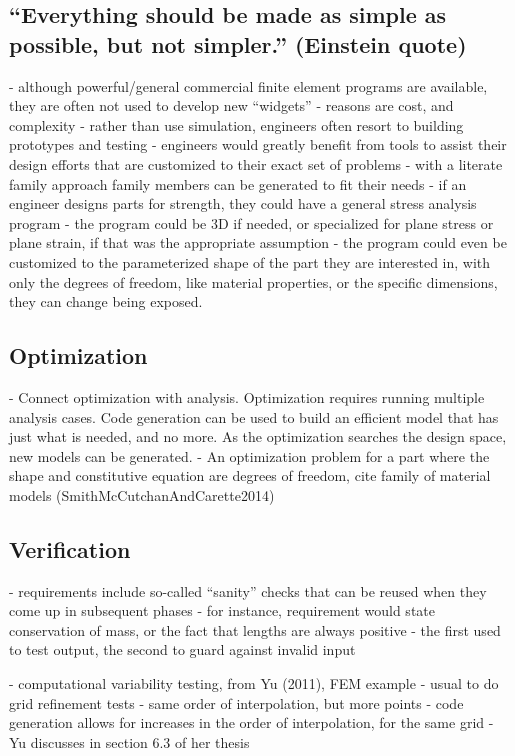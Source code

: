 \documentclass[10pt, preprint]{sigplanconf}
\begin{document}
\subsection{``Everything should be made as simple as possible, but not simpler.'' (Einstein quote)}
\label{subsec:everything}

- although powerful/general commercial finite element programs are available, they are often not used to develop new “widgets”
- reasons are cost, and complexity
- rather than use simulation, engineers often resort to building prototypes and testing
- engineers would greatly benefit from tools to assist their design efforts that are customized to their exact set of problems - with a literate family approach family members can be generated to fit their needs
- if an engineer designs parts for strength, they could have a general stress analysis program - the program could be 3D if needed, or specialized for plane stress or plane strain, if that was the appropriate assumption - the program could even be customized to the parameterized shape of the part they are interested in, with only the degrees of freedom, like material properties, or the specific dimensions, they can change being exposed.

\subsection{Optimization}
\label{subsec:optimization}

- Connect optimization with analysis.  Optimization requires running multiple analysis cases.  Code generation can be used to build an efficient model that has just what is needed, and no more.  As the optimization searches the design space, new models can be generated.
- An optimization problem for a part where the shape and constitutive equation are degrees of freedom, cite family of material models (SmithMcCutchanAndCarette2014)

\subsection{Verification}
\label{subsec:verification}

- requirements include so-called “sanity” checks that can be reused when they come up in subsequent phases
- for instance, requirement would state conservation of mass, or the fact that lengths are always positive - the first used to test output, the second to guard against invalid input

- computational variability testing, from Yu (2011), FEM example
- usual to do grid refinement tests - same order of interpolation, but more points
- code generation allows for increases in the order of interpolation, for the same grid
- Yu discusses in section 6.3 of her thesis
\end{document}
